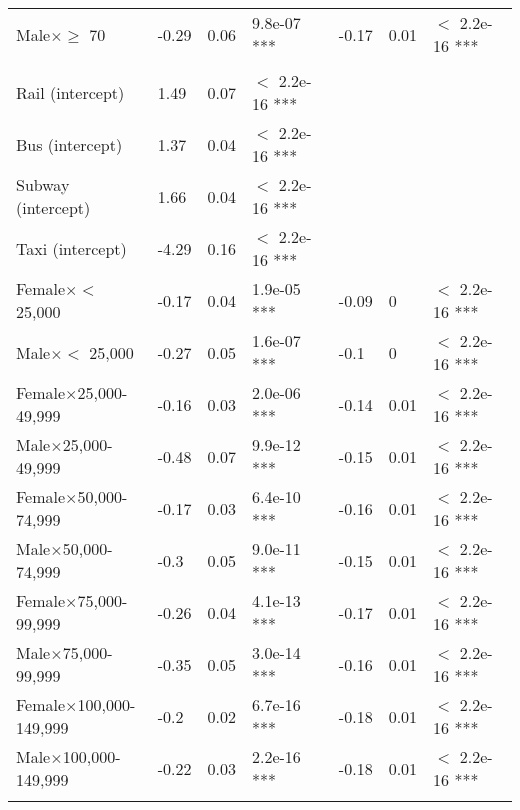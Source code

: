 \documentclass{article}\usepackage[utf8]{inputenc}
\begin{document}
\begin{longtable}[t]{lllllll}
\hspace{1em}Male$\times$$\geq$ 70 & -0.29 & 0.06 & 9.8e-07 *** & -0.17 & 0.01 & $<$ 2.2e-16 ***\\
\addlinespace[0.3em]
\multicolumn{7}{l}{\textbf{Gender$\times$Income, McFadden $R^2 = 0.55$}}\\
\hline
\hspace{1em}Rail (intercept) & 1.49 & 0.07 & $<$ 2.2e-16 *** &  &  & \\
\hspace{1em}Bus (intercept) & 1.37 & 0.04 & $<$ 2.2e-16 *** &  &  & \\
\hspace{1em}Subway (intercept) & 1.66 & 0.04 & $<$ 2.2e-16 *** &  &  & \\
\hspace{1em}Taxi (intercept) & -4.29 & 0.16 & $<$ 2.2e-16 *** &  &  & \\
\hspace{1em}Female$\times$$<$ 25,000 & -0.17 & 0.04 & 1.9e-05 *** & -0.09 & 0 & $<$ 2.2e-16 ***\\
\hspace{1em}Male$\times$$<$ 25,000 & -0.27 & 0.05 & 1.6e-07 *** & -0.1 & 0 & $<$ 2.2e-16 ***\\
\hspace{1em}Female$\times$25,000-49,999 & -0.16 & 0.03 & 2.0e-06 *** & -0.14 & 0.01 & $<$ 2.2e-16 ***\\
\hspace{1em}Male$\times$25,000-49,999 & -0.48 & 0.07 & 9.9e-12 *** & -0.15 & 0.01 & $<$ 2.2e-16 ***\\
\hspace{1em}Female$\times$50,000-74,999 & -0.17 & 0.03 & 6.4e-10 *** & -0.16 & 0.01 & $<$ 2.2e-16 ***\\
\hspace{1em}Male$\times$50,000-74,999 & -0.3 & 0.05 & 9.0e-11 *** & -0.15 & 0.01 & $<$ 2.2e-16 ***\\
\hspace{1em}Female$\times$75,000-99,999 & -0.26 & 0.04 & 4.1e-13 *** & -0.17 & 0.01 & $<$ 2.2e-16 ***\\
\hspace{1em}Male$\times$75,000-99,999 & -0.35 & 0.05 & 3.0e-14 *** & -0.16 & 0.01 & $<$ 2.2e-16 ***\\
\hspace{1em}Female$\times$100,000-149,999 & -0.2 & 0.02 & 6.7e-16 *** & -0.18 & 0.01 & $<$ 2.2e-16 ***\\
\hspace{1em}Male$\times$100,000-149,999 & -0.22 & 0.03 & 2.2e-16 *** & -0.18 & 0.01 & $<$ 2.2e-16 ***\\
$$
\end{longtable}
\end{document}
